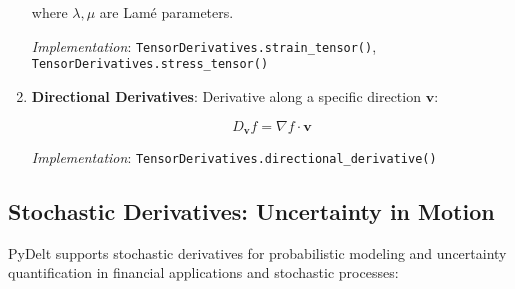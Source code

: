 \documentclass[10pt,journal,compsoc]{IEEEtran}
\begin{document}
\begin{enumerate}
    where $\lambda, \mu$ are Lamé parameters.
    
    
    \textit{Implementation}: \texttt{TensorDerivatives.strain\_tensor()}, \texttt{TensorDerivatives.stress\_tensor()}
    
    \item \textbf{Directional Derivatives}: Derivative along a specific direction $\mathbf{v}$:
    
    \begin{equation}
        D_{\mathbf{v}}f = \nabla f \cdot \mathbf{v}
    \end{equation}
    
    
    \textit{Implementation}: \texttt{TensorDerivatives.directional\_derivative()}
\end{enumerate}

\subsection{Stochastic Derivatives: Uncertainty in Motion}

PyDelt supports stochastic derivatives for probabilistic modeling and uncertainty quantification in financial applications and stochastic processes:
\end{document}
